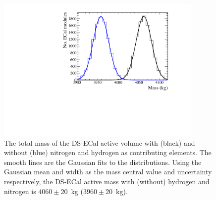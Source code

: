 \begin{figure}
  \centering
  \includegraphics[width=10cm]{images/measurement/systematics/detector/mass/TotalMass_DSECal.eps}
  \caption{The total mass of the DS-ECal active volume with (black) and without (blue) nitrogen and hydrogen as contributing elements.  The smooth lines are the Gaussian fits to the distributions.  Using the Gaussian mean and width as the mass central value and uncertainty respectively, the DS-ECal active mass with (without) hydrogen and nitrogen is $4060\pm20$~kg ($3960\pm20$~kg).}
  \label{fig:TotalMassDSECal}
\end{figure}

